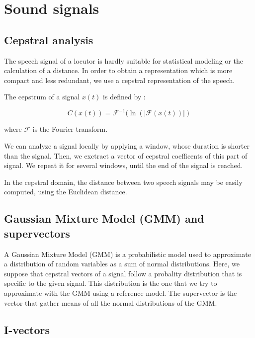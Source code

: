 \documentclass[conference]{IEEEtran}
\begin{document}
\section{Sound signals}

\subsection{Cepstral analysis}

The speech signal of a locutor is hardly suitable for statistical modeling or the calculation of a distance.
In order to obtain a representation which is more compact and less redundant, we use a cepstral representation of the speech.

The cepstrum of a signal $x(t)$ is defined by :

$$C(x(t)) = \mathcal{F}^{-1}(\ln(|\mathcal{F}(x(t))|)$$

where $\mathcal{F}$ is the Fourier transform.


We can analyze a signal locally by applying a window, whose duration is shorter than the signal. Then, we exctract a vector of cepstral coefficents of this part of signal. We repeat it for several windows, until the end of the signal is reached.

In the cepstral domain, the distance between two speech signals may be easily computed, using the Euclidean distance.



\subsection{Gaussian Mixture Model (GMM) and supervectors}

A Gaussian Mixture Model (GMM) is a probabilistic model used to approximate a distribution of random variables as a sum of normal distributions. 
Here, we suppose that cepstral vectors of a signal follow a probality distribution that is specific to the given signal. This distribution is the one that we try to approximate with the GMM using a reference model. The supervector is the vector that gather means of all the normal distributions of the GMM. \\



\subsection{I-vectors}

\end{document}
